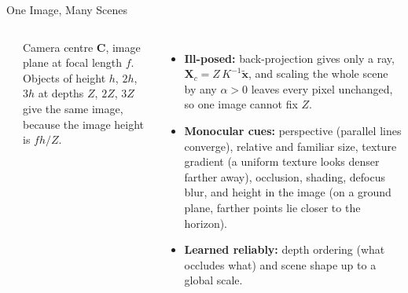 \begin{frame}{One Image, Many Scenes}
  \begin{columns}[T,onlytextwidth]
      \centering
      \vspace{0.8em}
      \\[0.8em]
      {\scriptsize Camera centre $\mathbf{C}$, image plane at focal length $f$. Objects of height $h$, $2h$, $3h$ at depths $Z$, $2Z$, $3Z$ give the same image, because the image height is $fh/Z$.\par}
      \begin{itemize}\footnotesize\itemsep0.3em
        \item \textbf{Ill-posed:} back-projection gives only a ray, $\mathbf{X}_c = Z\,K^{-1}\tilde{\mathbf{x}}$, and scaling the whole scene by any $\alpha>0$ leaves every pixel unchanged, so one image cannot fix $Z$.
        \item \textbf{Monocular cues:} perspective (parallel lines converge), relative and familiar size, texture gradient (a uniform texture looks denser farther away), occlusion, shading, defocus blur, and height in the image (on a ground plane, farther points lie closer to the horizon).
        \item \textbf{Learned reliably:} depth ordering (what occludes what) and scene shape up to a global scale.

\end{itemize}
\end{columns}
\end{frame}

